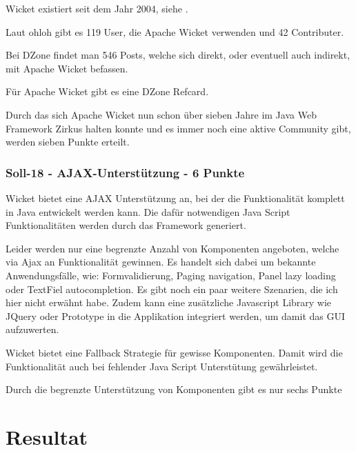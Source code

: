   Wicket existiert seit dem Jahr 2004, siehe \cite{WikiWicket}.

  Laut ohloh gibt es 119 User, die Apache Wicket verwenden und 42 Contributer.

  Bei DZone findet man 546 Posts, welche sich direkt, oder eventuell auch
  indirekt, mit Apache Wicket befassen.

  Für Apache Wicket gibt es eine DZone Refcard.
  
  Durch das sich Apache Wicket nun schon über sieben Jahre im Java Web Framework
  Zirkus halten konnte und es immer noch eine aktive Community gibt, werden
  sieben Punkte erteilt.
  
  \subsubsection{Soll-18 - AJAX-Unterstützung - 6 Punkte}
  
  Wicket bietet eine AJAX Unterstützung an, bei der die Funktionalität komplett
  in Java entwickelt werden kann. Die dafür notwendigen Java Script
  Funktionalitäten werden durch das Framework generiert.
  
  Leider werden nur eine begrenzte Anzahl von Komponenten angeboten, welche
  via \ac{Ajax} an Funktionalität gewinnen. Es handelt sich dabei um bekannte
  Anwendungsfälle, wie: Formvalidierung, Paging navigation, Panel lazy loading
  oder TextFiel autocompletion. Es gibt noch ein paar weitere Szenarien,
  die ich hier nicht erwähnt habe. Zudem kann eine zusätzliche Javascript
  Library wie JQuery oder Prototype in die Applikation integriert werden, um
  damit das \ac{GUI} aufzuwerten.
  
  Wicket bietet eine Fallback Strategie für gewisse Komponenten. Damit wird die
  Funktionalität auch bei fehlender Java Script Unterstütung gewährleistet.
  
  Durch die begrenzte Unterstützung von Komponenten gibt es nur sechs Punkte

  \section{Resultat}